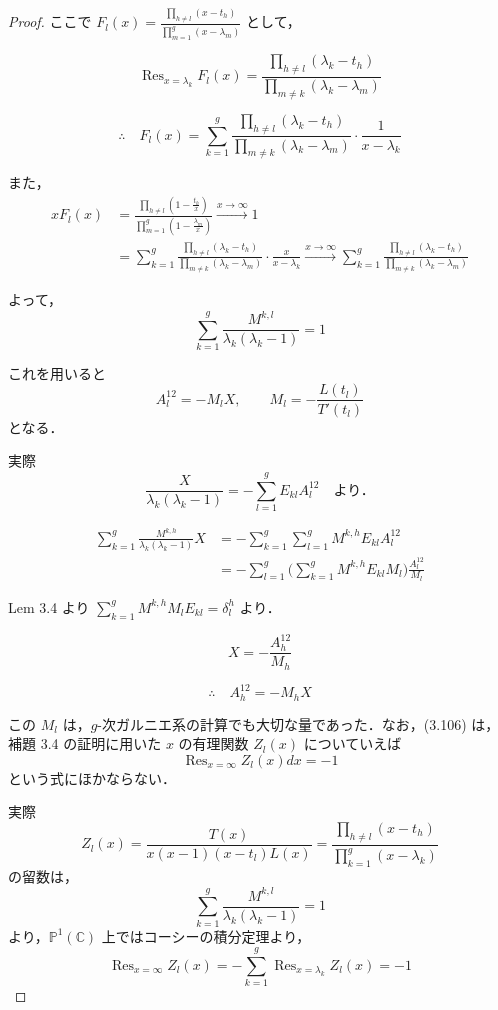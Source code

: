 \documentclass[paper=a4, fontsize=11pt]{jlreq} %
\newenvironment{story}{%
  \begin{mdframed}[
    backgroundcolor=red!5, %
    linewidth=0pt,         %
    innertopmargin=10pt,   %
    innerbottommargin=10pt,
    innerrightmargin=10pt, %
    innerleftmargin=10pt
  ]%
}{%
  \end{mdframed}%
}
\theoremstyle{break}
\theoremstyle{qa}
\begin{document}
\begin{story}
\begin{proof}
ここで $F_l(x) = \frac{\prod_{h \neq l} (x - t_h)}{\prod_{m=1}^g (x - \lambda_m)}$ として，

\[
\mathop{\mathrm{Res}}_{x=\lambda_k} F_l(x) = \frac{\prod_{h \neq l} (\lambda_k - t_h)}{\prod_{m \neq k} (\lambda_k - \lambda_m)}
\]

\[
\therefore \quad F_l(x) = \sum_{k=1}^g \frac{\prod_{h \neq l} (\lambda_k - t_h)}{\prod_{m \neq k} (\lambda_k - \lambda_m)} \cdot \frac{1}{x - \lambda_k}
\]

また，
\begin{align*}
    x F_l(x) &= \frac{\prod_{h \neq l} \left(1 - \frac{t_h}{x}\right)}{\prod_{m=1}^g \left(1 - \frac{\lambda_m}{x}\right)} \xrightarrow{x \to \infty} 1 \\
    &= \sum_{k=1}^g \frac{\prod_{h \neq l} (\lambda_k - t_h)}{\prod_{m \neq k} (\lambda_k - \lambda_m)} \cdot \frac{x}{x - \lambda_k} \xrightarrow{x \to \infty} \sum_{k=1}^g \frac{\prod_{h \neq l} (\lambda_k - t_h)}{\prod_{m \neq k} (\lambda_k - \lambda_m)}
\end{align*}

よって，
\[
\sum_{k=1}^g \frac{M^{k,l}}{\lambda_k (\lambda_k - 1)} = 1
\]

これを用いると
\[
A_l^{12} = - M_l X, \qquad M_l = - \frac{L(t_l)}{T'(t_l)}
\]
となる．

実際
\[
\frac{X}{\lambda_k(\lambda_k - 1)} = -\sum_{l=1}^g E_{kl} A_l^{12} \quad \text{より．}
\]

\begin{align*}
    \sum_{k=1}^g \frac{M^{k,h}}{\lambda_k(\lambda_k - 1)} X &= - \sum_{k=1}^g \sum_{l=1}^g M^{k,h} E_{kl} A_l^{12} \\
    &= - \sum_{l=1}^g \biggl( \sum_{k=1}^g M^{k,h} E_{kl} M_l \biggr) \frac{A_l^{12}}{M_l}
\end{align*}

Lem 3.4 より $\sum_{k=1}^g M^{k,h} M_l E_{kl} = \delta_l^h$ より．

\[
X = - \frac{A_h^{12}}{M_h}
\]

\[
\therefore \quad A_h^{12} = - M_h X
\]

この $M_l$ は，$g$-次ガルニエ系の計算でも大切な量であった．なお，(3.106) は，補題 3.4 の証明に用いた $x$ の有理関数 $Z_l(x)$ についていえば
\[
\mathop{\mathrm{Res}}_{x=\infty} Z_l(x)dx = -1
\]
という式にほかならない．

実際
\[
Z_l(x) = \frac{T(x)}{x(x-1)(x-t_l)L(x)} = \frac{\prod_{h \neq l} (x-t_h)}{\prod_{k=1}^g (x-\lambda_k)}
\]
の留数は，
\[
\sum_{k=1}^g \frac{M^{k,l}}{\lambda_k(\lambda_k-1)} = 1
\]
より，$\mathbb{P}^1(\mathbb{C})$ 上ではコーシーの積分定理より，
\[
\mathop{\mathrm{Res}}_{x=\infty} Z_l(x) = - \sum_{k=1}^g \mathop{\mathrm{Res}}_{x=\lambda_k} Z_l(x) = -1
\]


\end{proof}
\end{story}
\end{document}
